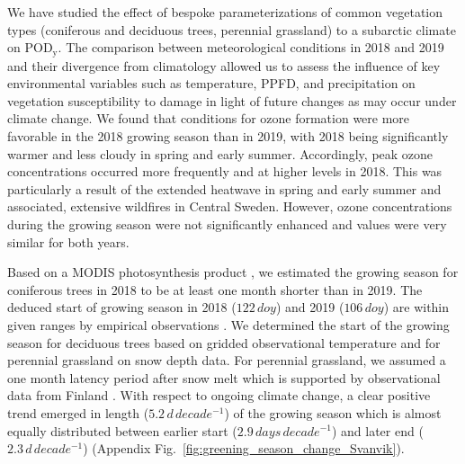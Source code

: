 \documentclass[bg, manuscript]{copernicus}
\begin{document}
\label{sec:conc}

We have studied the effect of bespoke parameterizations of common vegetation types (coniferous and deciduous trees, perennial grassland) to a subarctic climate on $\mathrm{POD_y}$. The comparison between meteorological conditions in 2018 and 2019 and their divergence from climatology allowed us to assess the influence of key environmental variables such as temperature, PPFD, and precipitation on vegetation susceptibility to  damage in light of future changes as may occur under climate change. We found that conditions for ozone formation were more favorable in the 2018 growing season than in 2019, with 2018 being significantly warmer and less cloudy in spring and early summer. Accordingly, peak ozone concentrations occurred more frequently and at higher levels in 2018. This was particularly a result of the extended heatwave in spring and early summer and associated, extensive wildfires in Central Sweden. However, ozone concentrations during the growing season were not significantly enhanced and  values were very similar for both years.

Based on a MODIS photosynthesis product \citep{MODIS_PSN}, we estimated the growing season for coniferous trees in 2018 to be at least one month shorter than in 2019. The deduced start of growing season in 2018 ($122\,\unit{doy}$) and 2019 ($106\,\unit{doy}$) are within given ranges by empirical observations \citep{TB:Kolari2007,IVL:Karlsson2018}. We determined the start of the growing season for deciduous trees based on gridded observational temperature and for perennial grassland on snow depth data. For perennial grassland, we assumed a one month latency period after snow melt which is supported by observational data from Finland \citep{FCR:Korhonen2018}. With respect to ongoing climate change, a clear positive trend emerged in length ($5.2\,\unit{d\,decade^{-1}}$) of the growing season which is almost equally distributed between earlier start ($2.9\,\unit{days\,decade^{-1}}$) and later end ($2.3\,\unit{d\,decade^{-1}}$) (Appendix Fig.~\ref{fig:greening_season_change_Svanvik}).
\end{document}
